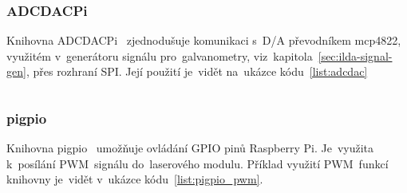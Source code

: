 \subsubsection{ADCDACPi}
Knihovna ADCDACPi~\cite{ADCDACPi} zjednodušuje komunikaci s~D/A převodníkem mcp4822, využitém v~generátoru signálu pro~galvanometry, viz~kapitola~\ref{sec:ilda-signal-gen}, přes rozhraní SPI. Její použití je~vidět na~ukázce kódu~\ref{list:adcdac}
\begin{code}
  \inputminted[frame=lines,fontsize=\footnotesize{}, linenos, breaklines]{cpp}{code_examples/adcdac.cpp}
\end{code}

\subsubsection{pigpio}\label{sec:ls_pigpio}
Knihovna pigpio~\cite{pigpio} umožňuje ovládání GPIO pinů Raspberry Pi. Je~využita k~posílání PWM~signálu do~laserového modulu. Příklad využití PWM~funkcí knihovny je~vidět v~ukázce kódu~\ref{list:pigpio_pwm}.

\begin{code}
  \inputminted[frame=lines,fontsize=\footnotesize{}, linenos, breaklines]{cpp}{code_examples/pigpio_pwm.cpp}
\end{code}


